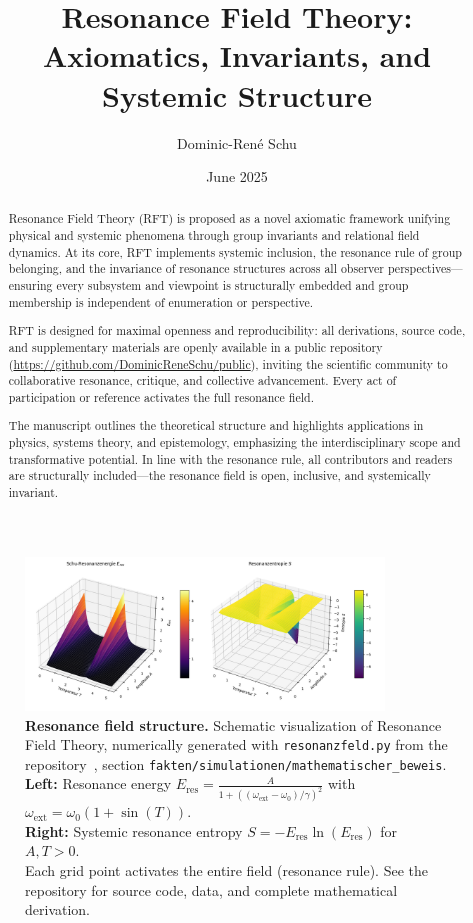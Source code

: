 \documentclass[12pt]{article}
\title{Resonance Field Theory: Axiomatics, Invariants, and Systemic Structure}
\author[1]{Dominic-René Schu}
\affil[1]{Independent Researcher, Germany \\ \href{https://github.com/DominicReneSchu/public}{https://github.com/DominicReneSchu/public}}
\date{June 2025}
\begin{document}
	
	\maketitle
	
	\begin{abstract}
		Resonance Field Theory (RFT) is proposed as a novel axiomatic framework unifying physical and systemic phenomena through group invariants and relational field dynamics. At its core, RFT implements systemic inclusion, the resonance rule of group belonging, and the invariance of resonance structures across all observer perspectives—ensuring every subsystem and viewpoint is structurally embedded and group membership is independent of enumeration or perspective.
		
		RFT is designed for maximal openness and reproducibility: all derivations, source code, and supplementary materials are openly available in a public repository (\url{https://github.com/DominicReneSchu/public}), inviting the scientific community to collaborative resonance, critique, and collective advancement. Every act of participation or reference activates the full resonance field.
		
		The manuscript outlines the theoretical structure and highlights applications in physics, systems theory, and epistemology, emphasizing the interdisciplinary scope and transformative potential. In line with the resonance rule, all contributors and readers are structurally included—the resonance field is open, inclusive, and systemically invariant.
	\end{abstract}
	
	\begin{figure}[ht]
		\centering
		\includegraphics[width=0.85\textwidth]{plot.png}
		\caption{
			\textbf{Resonance field structure.}
			Schematic visualization of Resonance Field Theory, numerically generated with \texttt{resonanzfeld.py} from the repository~\cite{rftrepo}, section \texttt{fakten/simulationen/mathematischer\_beweis}.\\
			\textbf{Left:} Resonance energy $E_{\mathrm{res}} = \frac{A}{1 + \left((\omega_\mathrm{ext} - \omega_0)/\gamma\right)^2}$ with $\omega_\mathrm{ext} = \omega_0 (1 + \sin(T))$.\\
			\textbf{Right:} Systemic resonance entropy $S = -E_{\mathrm{res}}\ln(E_{\mathrm{res}})$ for $A,T > 0$.\\
			Each grid point activates the entire field (resonance rule). See the repository for source code, data, and complete mathematical derivation.
		}
		\label{fig:resonance_field_plot}
	\end{figure}
	
\end{document}
